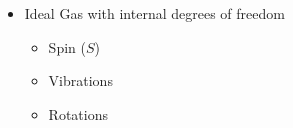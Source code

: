 \begin{itemize}
  \item Ideal Gas with internal degrees of freedom

    \begin{itemize}

      \item Spin ($S$)

      \item Vibrations

      \item Rotations

    \end{itemize}

\end{itemize}





